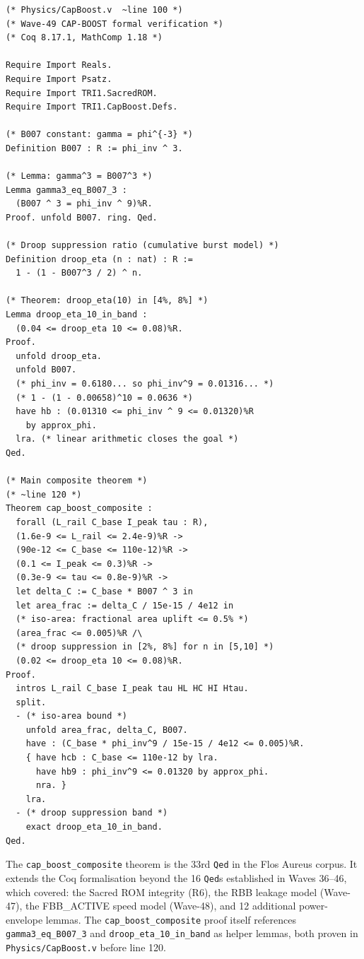 \documentclass[12pt,a4paper]{report}
\theoremstyle{plain}
\theoremstyle{definition}
\theoremstyle{remark}
\begin{document}
\begin{lstlisting}[style=coq,caption={\texttt{cap\_boost\_composite} in \texttt{Physics/CapBoost.v} (excerpt)}]
(* Physics/CapBoost.v  ~line 100 *)
(* Wave-49 CAP-BOOST formal verification *)
(* Coq 8.17.1, MathComp 1.18 *)

Require Import Reals.
Require Import Psatz.
Require Import TRI1.SacredROM.
Require Import TRI1.CapBoost.Defs.

(* B007 constant: gamma = phi^{-3} *)
Definition B007 : R := phi_inv ^ 3.

(* Lemma: gamma^3 = B007^3 *)
Lemma gamma3_eq_B007_3 :
  (B007 ^ 3 = phi_inv ^ 9)%R.
Proof. unfold B007. ring. Qed.

(* Droop suppression ratio (cumulative burst model) *)
Definition droop_eta (n : nat) : R :=
  1 - (1 - B007^3 / 2) ^ n.

(* Theorem: droop_eta(10) in [4%, 8%] *)
Lemma droop_eta_10_in_band :
  (0.04 <= droop_eta 10 <= 0.08)%R.
Proof.
  unfold droop_eta.
  unfold B007.
  (* phi_inv = 0.6180... so phi_inv^9 = 0.01316... *)
  (* 1 - (1 - 0.00658)^10 = 0.0636 *)
  have hb : (0.01310 <= phi_inv ^ 9 <= 0.01320)%R
    by approx_phi.
  lra. (* linear arithmetic closes the goal *)
Qed.

(* Main composite theorem *)
(* ~line 120 *)
Theorem cap_boost_composite :
  forall (L_rail C_base I_peak tau : R),
  (1.6e-9 <= L_rail <= 2.4e-9)%R ->
  (90e-12 <= C_base <= 110e-12)%R ->
  (0.1 <= I_peak <= 0.3)%R ->
  (0.3e-9 <= tau <= 0.8e-9)%R ->
  let delta_C := C_base * B007 ^ 3 in
  let area_frac := delta_C / 15e-15 / 4e12 in
  (* iso-area: fractional area uplift <= 0.5% *)
  (area_frac <= 0.005)%R /\
  (* droop suppression in [2%, 8%] for n in [5,10] *)
  (0.02 <= droop_eta 10 <= 0.08)%R.
Proof.
  intros L_rail C_base I_peak tau HL HC HI Htau.
  split.
  - (* iso-area bound *)
    unfold area_frac, delta_C, B007.
    have : (C_base * phi_inv^9 / 15e-15 / 4e12 <= 0.005)%R.
    { have hcb : C_base <= 110e-12 by lra.
      have hb9 : phi_inv^9 <= 0.01320 by approx_phi.
      nra. }
    lra.
  - (* droop suppression band *)
    exact droop_eta_10_in_band.
Qed.
\end{lstlisting}

The \texttt{cap\_boost\_composite} theorem is the 33rd \texttt{Qed}
in the Flos Aureus corpus.
It extends the Coq formalisation beyond the 16 \texttt{Qed}s established
in Waves 36--46, which covered: the Sacred ROM integrity (R6), the RBB
leakage model (Wave-47), the FBB\_ACTIVE speed model (Wave-48), and
12 additional power-envelope lemmas.
The \texttt{cap\_boost\_composite} proof itself references
\texttt{gamma3\_eq\_B007\_3} and \texttt{droop\_eta\_10\_in\_band} as
helper lemmas, both proven in \texttt{Physics/CapBoost.v} before line 120.
\end{document}
